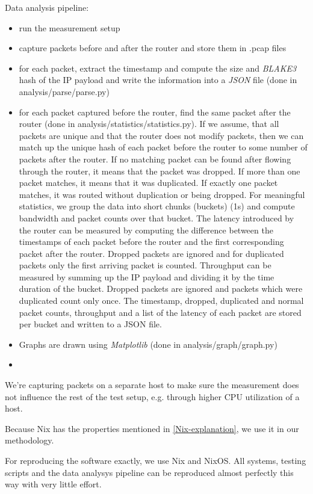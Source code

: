 Data analysis pipeline:
\begin{itemize}
  \item run the measurement setup
  \item capture packets before and after the router and store them in .pcap files
  \item for each packet, extract the timestamp and compute the size and \textit{BLAKE3} \cite{wiki:BLAKE3} hash of the IP payload and write the information into a \textit{JSON} \cite{wiki:JSON} file (done in analysis/parse/parse.py)
  \item for each packet captured before the router, find the same packet after the router (done in analysis/statistics/statistics.py). If we assume, that all packets are unique and that the router does not modify packets, then we can match up the unique hash of each packet before the router to some number of packets after the router. If no matching packet can be found after flowing through the router, it means that the packet was dropped. If more than one packet matches, it means that it was duplicated. If exactly one packet matches, it was routed without duplication or being dropped. For meaningful statistics, we group the data into short chunks (buckets) (1s) and compute bandwidth and packet counts over that bucket. The latency introduced by the router can be measured by computing the difference between the timestamps of each packet before the router and the first corresponding packet after the router. Dropped packets are ignored and for duplicated packets only the first arriving packet is counted. Throughput can be measured by summing up the IP payload  and dividing it by the time duration of the bucket. Dropped packets are ignored and packets which were duplicated count only once. The timestamp, dropped, duplicated and normal packet counts, throughput and a list of the latency of each packet are stored per bucket and written to a JSON file.
  \item Graphs are drawn using \textit{Matplotlib} \cite{Matplotlib} (done in analysis/graph/graph.py)
  \item {}
\end{itemize}


We're capturing packets on a separate host to make sure the measurement does not influence the rest of the test setup, e.g. through higher CPU utilization of a host.


Because Nix has the properties mentioned in \ref{Nix-explanation}, we use it in our methodology.


For reproducing the software exactly, we use Nix and NixOS.
All systems, testing scripts and the data analysys pipeline can be reproduced almost perfectly this way with very little effort.



\cite{RFC7858}